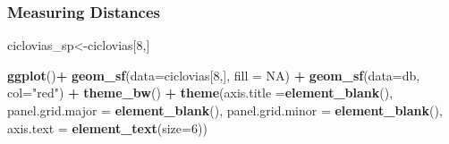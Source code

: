 \documentclass[
  shownotes,
  xcolor={svgnames},
  hyperref={colorlinks,citecolor=DarkBlue,linkcolor=DarkRed,urlcolor=DarkBlue}
  ]{beamer}
\newenvironment{Shaded}{\begin{snugshade}}{\end{snugshade}}
\newcommand{\DataTypeTok}[1]{\textcolor[rgb]{0.13,0.29,0.53}{#1}}
\newcommand{\DecValTok}[1]{\textcolor[rgb]{0.00,0.00,0.81}{#1}}
\newcommand{\KeywordTok}[1]{\textcolor[rgb]{0.13,0.29,0.53}{\textbf{#1}}}
\newcommand{\NormalTok}[1]{#1}
\newcommand{\OperatorTok}[1]{\textcolor[rgb]{0.81,0.36,0.00}{\textbf{#1}}}
\newcommand{\OtherTok}[1]{\textcolor[rgb]{0.56,0.35,0.01}{#1}}
\newcommand{\StringTok}[1]{\textcolor[rgb]{0.31,0.60,0.02}{#1}}
\begin{document}
\begin{frame}[fragile]
\frametitle{Measuring Distances}


\begin{minipage}[t]{0.52\linewidth}
        \begin{scriptsize}
\begin{Shaded}
\begin{Highlighting}[]
\NormalTok{ciclovias\_sp\textless{}{-}ciclovias[}\DecValTok{8}\NormalTok{,]}

\KeywordTok{ggplot}\NormalTok{()}\OperatorTok{+}
\StringTok{  }\KeywordTok{geom\_sf}\NormalTok{(}\DataTypeTok{data=}\NormalTok{ciclovias[}\DecValTok{8}\NormalTok{,], }\DataTypeTok{fill =} \OtherTok{NA}\NormalTok{) }\OperatorTok{+}
\StringTok{  }\KeywordTok{geom\_sf}\NormalTok{(}\DataTypeTok{data=}\NormalTok{db, }\DataTypeTok{col=}\StringTok{"red"}\NormalTok{) }\OperatorTok{+}
\StringTok{  }\KeywordTok{theme\_bw}\NormalTok{() }\OperatorTok{+}
\StringTok{  }\KeywordTok{theme}\NormalTok{(}\DataTypeTok{axis.title =}\KeywordTok{element\_blank}\NormalTok{(),}
        \DataTypeTok{panel.grid.major =} \KeywordTok{element\_blank}\NormalTok{(),}
        \DataTypeTok{panel.grid.minor =} \KeywordTok{element\_blank}\NormalTok{(),}
        \DataTypeTok{axis.text =} \KeywordTok{element\_text}\NormalTok{(}\DataTypeTok{size=}\DecValTok{6}\NormalTok{))}
\end{Highlighting}
\end{Shaded}
  \end{scriptsize}
    \end{minipage}
    \hfill
    \begin{minipage}[t]{0.43\linewidth}%
       \medskip
        \begin{figure}[H] \centering
            \captionsetup{justification=centering}

\end{figure}
\end{minipage}
\end{frame}
\end{document}
